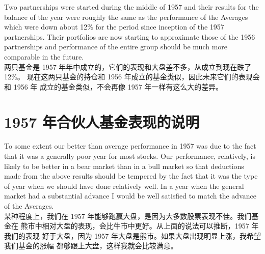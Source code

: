 \begin{verseparallel}
  {
    Two partnerships were started during the middle of 1957 and their results
    for the balance of the year were roughly the same as the performance of the
    Averages which were down about 12\% for the period since inception of the
    1957 partnerships. Their portfolios are now starting to approximate those of
    the 1956 partnerships and performance of the entire group should be much
    more comparable in the future. \\
  }
  {
    两只基金是 1957 年年中成立的，它们的表现和大盘差不多，从成立到现在跌了 12\%。
    现在这两只基金的持仓和 1956 年成立的基金类似，因此未来它们的表现会和 1956 年
    成立的基金类似，不会再像 1957 年一样有这么大的差异。
  }
\end{verseparallel}

\section{1957 年合伙人基金表现的说明}
\begin{verseparallel}
  {
    To some extent our better than average performance in 1957 was due to the
    fact that it was a generally poor year for most stocks. Our performance,
    relatively, is likely to be better in a bear market than in a bull market so
    that deductions made from the above results should be tempered by the fact
    that it was the type of year when we should have done relatively well. In a
    year when the general market had a substantial advance I would be well
    satisfied to match the advance of the Averages. \\
  }
  {
    某种程度上，我们在 1957 年能够跑赢大盘，是因为大多数股票表现不佳。我们基金在
    熊市中相对大盘的表现，会比牛市中更好。从上面的说法可以推断，1957 年我们的表现
    好于大盘，因为 1957 年大盘是熊市。如果大盘出现明显上涨，我希望我们基金的涨幅
    都够跟上大盘，这样我就会比较满意。
  }
\end{verseparallel}

